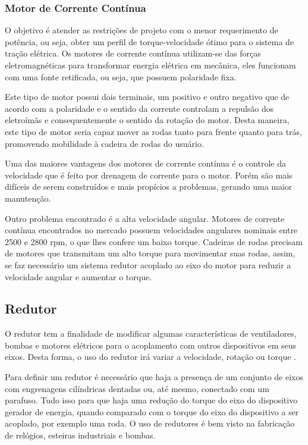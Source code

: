 \subsubsection{Motor de Corrente Contínua}

O objetivo é atender as restrições de projeto com o menor requerimento de potência, ou seja, obter um perfil de torque-velocidade ótimo para o sistema de tração elétrica. Os motores de corrente contínua utilizam-se das forças eletromagnéticas para transformar energia elétrica em mecânica, eles funcionam com uma fonte retificada, ou seja, que possuem polaridade fixa.

Este tipo de motor possui dois terminais, um positivo e outro negativo que de acordo com a polaridade e o sentido da corrente controlam a repulsão dos eletroímãs e consequentemente o sentido da rotação do motor. Desta maneira, este tipo de motor seria capaz mover as rodas tanto para frente quanto para trás, promovendo mobilidade à cadeira de rodas do usuário.

Uma das maiores vantagens dos motores de corrente contínua é o controle da velocidade que é feito por drenagem de corrente para o motor. Porém são mais difíceis de serem construídos e mais propícios a problemas, gerando uma maior manutenção.

Outro problema encontrado é a alta velocidade angular. Motores de corrente contínua encontrados no mercado possuem velocidades angulares nominais entre 2500 e 2800 rpm, o que lhes confere um baixo torque. Cadeiras de rodas precisam de motores que transmitam um alto torque para movimentar suas rodas, assim, se faz necessário um sistema redutor acoplado ao eixo do motor para reduzir a velocidade angular e aumentar o torque.

\subsection{Redutor}

O redutor tem a finalidade de modificar algumas características de ventiladores, bombas e motores elétricos para o acoplamento com outros dispositivos em seus eixos. Desta forma, o uso do redutor irá variar a velocidade, rotação ou torque \cite{apresentacao_andrade}.

Para definir um redutor é necessário que haja a presença de um conjunto de eixos com engrenagens cilíndricas dentadas ou, até mesmo, conectado com um parafuso. Tudo isso para que haja uma redução do torque do eixo do dispositivo gerador de energia, quando comparado com o torque do eixo do dispositivo a ser acoplado, por exemplo uma roda. O uso de redutores é bem visto na fabricação de relógios, esteiras industriais e bombas.

